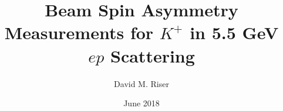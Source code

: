 \title{Beam Spin Asymmetry Measurements for $K^+$ in 5.5 GeV $ep$ Scattering}
\author{David M. Riser}
\date{June 2018}

